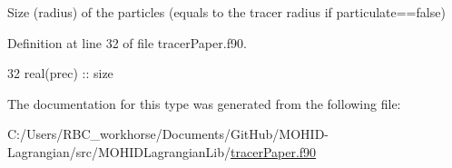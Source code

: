 Size (radius) of the particles (equals to the tracer radius if particulate==false) 



Definition at line 32 of file tracer\+Paper.\+f90.


\begin{DoxyCode}
32         \textcolor{keywordtype}{real(prec)} :: size
\end{DoxyCode}


The documentation for this type was generated from the following file\+:\begin{DoxyCompactItemize}
\item 
C\+:/\+Users/\+R\+B\+C\+\_\+workhorse/\+Documents/\+Git\+Hub/\+M\+O\+H\+I\+D-\/\+Lagrangian/src/\+M\+O\+H\+I\+D\+Lagrangian\+Lib/\mbox{\hyperlink{tracer_paper_8f90}{tracer\+Paper.\+f90}}\end{DoxyCompactItemize}
